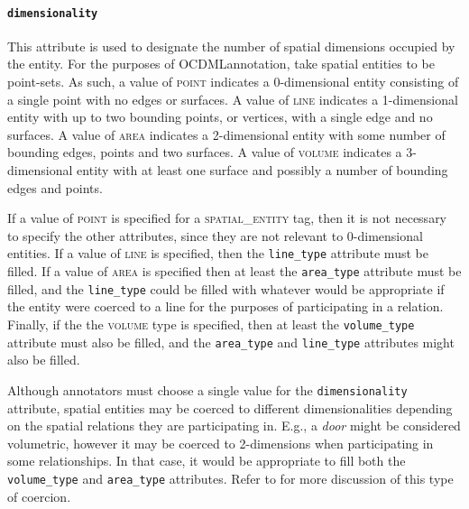 \documentclass[11pt]{article}
\newcommand{\ML}{OCDML}
\newenvironment{note}
{\list{}
 {\setlength
  {\itemindent}
  {\listparindent}}
   \item[\textbf{Note:}]\relax}
{\endlist}
\begin{document}
\paragraph{\texttt{dimensionality}} %
\label{par:dimensionality}
This attribute is used to designate the number of spatial dimensions occupied by the entity. For the purposes of \ML annotation, take spatial entities to be point-sets. As such, a value of \textsc{point} indicates a 0-dimensional entity consisting of a single point with no edges or surfaces. A value of \textsc{line} indicates a 1-dimensional entity with up to two bounding points, or vertices, with a single edge and no surfaces. A value of \textsc{area} indicates a 2-dimensional entity with some number of bounding edges, points and two surfaces. A value of \textsc{volume} indicates a 3-dimensional entity with at least one surface and possibly a number of bounding edges and points.

If a value of \textsc{point} is specified for a \textsc{spatial\_entity} tag, then it is not necessary to specify the other attributes, since they are not relevant to 0-dimensional entities. If a value of \textsc{line} is specified, then the \texttt{line\_type} attribute must be filled. If a value of \textsc{area} is specified then at least the \texttt{area\_type} attribute must be filled, and the \texttt{line\_type} could be filled with whatever would be appropriate if the entity were coerced to a line for the purposes of participating in a relation. Finally, if the the \textsc{volume} type is specified, then at least the \texttt{volume\_type} attribute must also be filled, and the \texttt{area\_type} and \texttt{line\_type} attributes might also be filled.

\begin{note}
Although annotators must choose a single value for the \texttt{dimensionality} attribute, spatial entities may be coerced to different dimensionalities depending on the spatial relations they are participating in. E.g., a \emph{door} might be considered volumetric, however it may be coerced to 2-dimensions when participating in some relationships. In that case, it would be appropriate to fill both the \texttt{volume\_type} and \texttt{area\_type} attributes. Refer to  for more discussion of this type of coercion.
\end{note}

\end{document}
